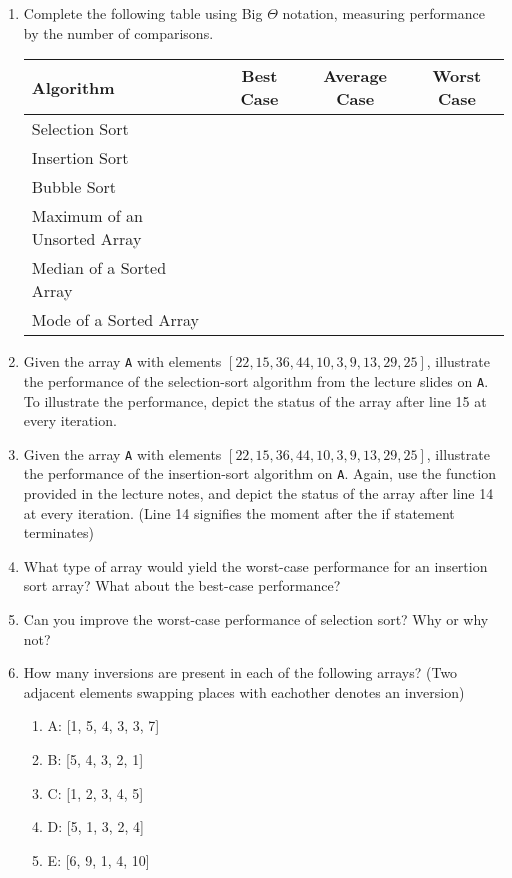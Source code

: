 \documentclass[11pt]{article}
\begin{document}
\begin{enumerate}[leftmargin=*]
    \pagebreak
    \item Complete the following table using Big $\Theta$ notation, measuring performance by the number of comparisons.
    \begin{center}
        \begin{tabular}{l | c | c | c }
            Algorithm & Best Case & Average Case & Worst Case \\ \hline
            Selection Sort & & & \\ \hline
            Insertion Sort & & & \\ \hline
            Bubble Sort & & & \\ \hline
            Maximum of an Unsorted Array & & & \\ \hline
            Median of a Sorted Array & & & \\ \hline
            Mode of a Sorted Array & & & \\ \hline
        \end{tabular}
    \end{center}
    
    \item Given the array \verb|A| with elements $[22, 15, 36, 44, 10, 3, 9, 13, 29, 25]$, illustrate the performance of the selection-sort algorithm from the lecture slides on \verb|A|. To illustrate the performance, depict the status of the array after line 15 at every iteration.
    
    \item Given the array \verb|A| with elements $[22, 15, 36, 44, 10, 3, 9, 13, 29, 25]$, illustrate the performance of the insertion-sort algorithm on \verb|A|. Again, use the function provided in the lecture notes, and depict the status of the array after line 14 at every iteration. (Line 14 signifies the moment after the if statement terminates)
    
    \item What type of array would yield the worst-case performance for an insertion sort array? What about the best-case performance? 
    
    \item Can you improve the worst-case performance of selection sort? Why or why not?
    
    \item How many inversions are present in each of the following arrays? (Two adjacent elements swapping places with eachother denotes an inversion)
    \begin{enumerate}
        \item[] A: [1, 5, 4, 3, 3, 7]
        \item[] B: [5, 4, 3, 2, 1]
        \item[] C: [1, 2, 3, 4, 5]
        \item[] D: [5, 1, 3, 2, 4]
        \item[] E: [6, 9, 1, 4, 10]
    \end{enumerate}
    
\end{enumerate}

\label{r:lastpage}
\end{document}

